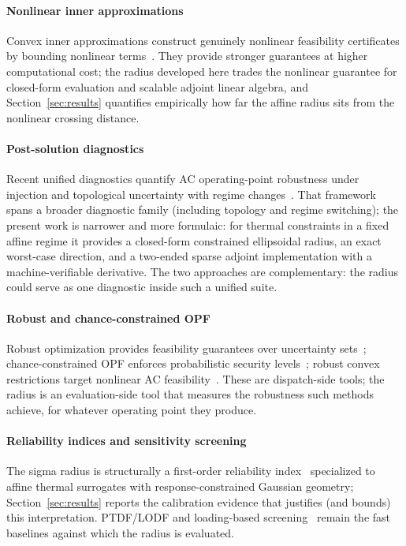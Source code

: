 \documentclass[11pt]{article}
\begin{document}


\paragraph{Nonlinear inner approximations}
Convex inner approximations construct genuinely nonlinear feasibility
certificates by bounding nonlinear terms~\citep{NguyenDvijothamTuritsyn2019}.
They provide stronger guarantees at higher computational cost; the radius
developed here trades the nonlinear guarantee for closed-form evaluation
and scalable adjoint linear algebra, and Section~\ref{sec:results}
quantifies empirically how far the affine radius sits from the nonlinear
crossing distance.

\paragraph{Post-solution diagnostics}
Recent unified diagnostics quantify AC operating-point robustness under
injection and topological uncertainty with regime
changes~\citep{AntonIlic2026Diagnostics}.  That framework spans a broader
diagnostic family (including topology and regime switching); the present
work is narrower and more formulaic: for thermal constraints in a fixed
affine regime it provides a closed-form constrained ellipsoidal radius, an
exact worst-case direction, and a two-ended sparse adjoint implementation
with a machine-verifiable derivative.  The two approaches are complementary:
the radius could serve as one diagnostic inside such a unified suite.

\paragraph{Robust and chance-constrained OPF}
Robust optimization provides feasibility guarantees over uncertainty
sets~\citep{BenTalNemirovski1998,BertsimasSim2004}; chance-constrained OPF
enforces probabilistic security
levels~\citep{BienstockChertkovHarnett2014,RoaldEtAl2016,%
LubinBackhausDvorkin2016}; robust convex restrictions target nonlinear AC
feasibility~\citep{LeeEtAl2021RobustAC}.  These are dispatch-side tools; the
radius is an evaluation-side tool that measures the robustness such methods
achieve, for whatever operating point they produce.

\paragraph{Reliability indices and sensitivity screening}
The sigma radius is structurally a first-order reliability
index~\citep{HasoferLind1974} specialized to affine thermal surrogates with
response-constrained Gaussian geometry; Section~\ref{sec:results} reports
the calibration evidence that justifies (and bounds) this interpretation.
PTDF/LODF and loading-based screening~\citep{WoodWollenbergSheble2013}
remain the fast baselines against which the radius is evaluated.
\end{document}
